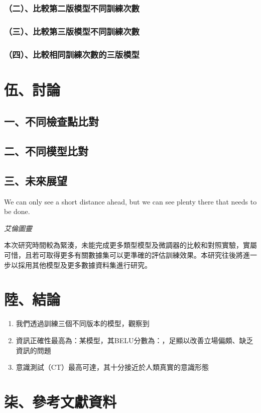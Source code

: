\documentclass[8pt,a4paper,MingLiU,UTF8]{article}
\begin{document}
\subsubsection{（二）、比較第二版模型不同訓練次數}
\subsubsection{（三）、比較第三版模型不同訓練次數}
\subsubsection{（四）、比較相同訓練次數的三版模型}

	\section{伍、討論}

	\subsection{一、不同檢查點比對}
	\subsection{二、不同模型比對}
	\subsection{三、未來展望}
	\epigraph{	We can only see a short distance ahead, but we can see plenty there that needs to be done.}{\textit{艾倫圖靈}}
	本次研究時間較為緊湊，未能完成更多類型模型及微調器的比較和對照實驗，實屬可惜，且若可取得更多有關數據集可以更準確的評估訓練效果。本研究往後將進一步以採用其他模型及更多數據資料集進行研究。

	\section{陸、結論}
		\begin{enumerate}
			\item 我們透過訓練三個不同版本的模型，觀察到
			\item 資訊正確性最高為：某模型，其BELU分數為：，足顯以改善立場偏頗、缺乏資訊的問題
			\item 意識測試（CT）最高可達，其十分接近於人類真實的意識形態
		\end{enumerate}
	\section{柒、參考文獻資料}
	
	\renewcommand{\refname}{}
	
\end{document}
